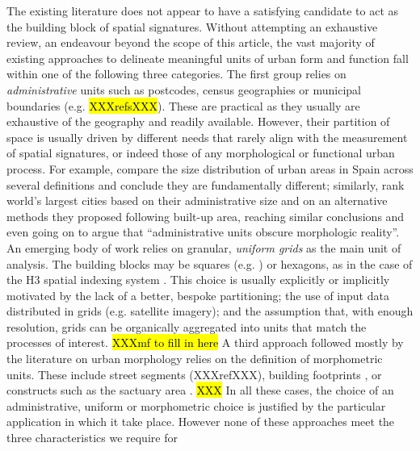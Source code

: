 The existing literature does not appear to have a satisfying candidate to act
as the building block of spatial signatures.
%
Without attempting an exhaustive review, an endeavour beyond the scope of this
article, the vast majority of existing approaches to delineate meaningful
units of urban form and function fall within one of the following three
categories.
The first group relies on \textit{administrative} units such as postcodes, census geographies
or municipal boundaries (e.g. \hl{XXXrefsXXX}).
%
These are practical as they usually are exhaustive of the geography and
readily available. However, their partition of space is usually driven by
different needs that rarely align with the measurement of spatial signatures,
or indeed those of any morphological or functional urban process. For example,
\cite{puente2020sensitive} compare the size distribution of urban areas in
Spain across several definitions and conclude they are fundamentally
different; similarly, \cite{taubenbock2019new} rank world's largest cities
based on their administrative size and on an alternative methods they proposed
following built-up area, reaching similar conclusions and even going on to
argue that ``administrative units obscure morphologic reality''.
An emerging body of work relies on granular, \textit{uniform grids} as the main unit of
analysis. The building blocks may be squares (e.g. \citealp{jochem2020}) or
hexagons, as in the case of the H3 spatial indexing system
\citep{brodsky2018h3}. This choice is usually explicitly or implicitly
motivated by the lack of a better, bespoke partitioning; the use of input data distributed
in grids (e.g. satellite imagery); and the assumption that, with enough
resolution, grids can be organically aggregated into units that match the
processes of interest.
\hl{XXXmf to fill in here}
A third approach followed mostly by the literature on urban morphology relies
on the definition of morphometric units. These include street segments
(XXXrefXXX), building footprints \citep{fleischmann2020morphological}, or constructs such as the
sactuary area \citep{mehaffy2010urban,dibble2019origin}.
\hl{XXX}
In all these cases, the choice of an administrative, uniform or morphometric
choice is justified by the particular application in which it take place.
However none of these approaches meet the three characteristics we require for
